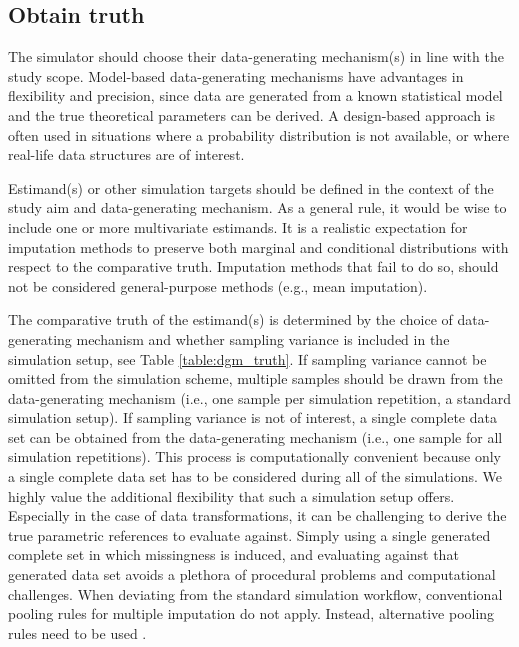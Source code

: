 \documentclass[bimj,fleqn]{w-art}
\begin{document}
\subsection{Obtain truth}


The simulator should choose their data-generating mechanism(s) in line with the study scope. Model-based data-generating mechanisms have advantages in flexibility and precision, since data are generated from a known statistical model and the true theoretical parameters can be derived. A design-based approach is often used in situations where a probability distribution is not available, or where real-life data structures are of interest.  

Estimand(s) or other simulation targets should be defined in the context of the study aim and data-generating mechanism. As a general rule, it would be wise to include one or more multivariate estimands. It is a realistic expectation for imputation methods to preserve both marginal and conditional distributions with respect to the comparative truth. Imputation methods that fail to do so, should not be considered general-purpose methods (e.g., mean imputation).

The comparative truth of the estimand(s) is determined by the choice of data-generating mechanism and whether sampling variance is included in the simulation setup, see Table \ref{table:dgm_truth}. If sampling variance cannot be omitted from the simulation scheme, multiple samples should be drawn from the data-generating mechanism (i.e., one sample per simulation repetition, a standard simulation setup). If sampling variance is not of interest, a single complete data set can be obtained from the data-generating mechanism (i.e., one sample for all simulation repetitions). This process is computationally convenient because only a single complete data set has to be considered during all of the simulations. We highly value the additional flexibility that such a simulation setup offers. Especially in the case of data transformations, it can be challenging to derive the true parametric references to evaluate against. Simply using a single generated complete set in which missingness is induced, and evaluating against that generated data set avoids a plethora of procedural problems and computational challenges.
When deviating from the standard simulation workflow, conventional pooling rules for multiple imputation \citep[cf.][p. 76-77]{rubi87} do not apply. Instead, alternative pooling rules need to be used \citep{raghunathan2003multiple,vink14}.
\end{document}
